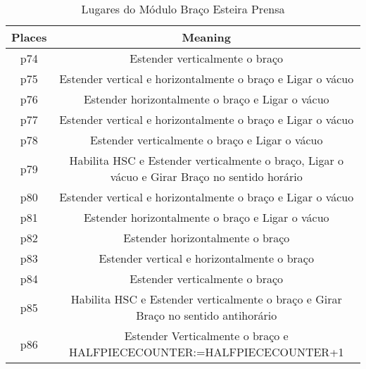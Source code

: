 \begin{table}[htbp]
\caption{Lugares do Módulo Braço Esteira Prensa}
\centering
\begin{tabular}{c|c}
Places & Meaning\\
\hline
p74 & Estender verticalmente o braço\\
p75 & Estender vertical e horizontalmente o braço e Ligar o vácuo\\
p76 & Estender horizontalmente o braço e Ligar o vácuo\\
p77 & Estender vertical e horizontalmente o braço e Ligar o vácuo\\
p78 & Estender verticalmente o braço e Ligar o vácuo\\
p79 & Habilita HSC e Estender verticalmente o braço, Ligar o vácuo e Girar Braço no sentido horário\\
p80 & Estender vertical e horizontalmente o braço e Ligar o vácuo\\
p81 & Estender horizontalmente o braço e Ligar o vácuo\\
p82 & Estender horizontalmente o braço\\
p83 & Estender vertical e horizontalmente o braço\\
p84 & Estender verticalmente o braço\\
p85 & Habilita HSC e Estender verticalmente o braço e Girar Braço no sentido antihorário\\
p86 & Estender Verticalmente o braço e HALFPIECECOUNTER:=HALFPIECECOUNTER+1\\
\end{tabular}
\end{table}

